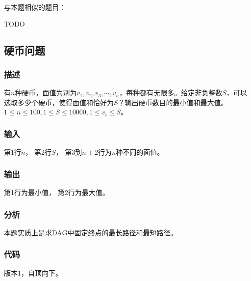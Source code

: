 与本题相似的题目：
\begindot
\item  TODO
\myenddot

\subsection{硬币问题}

\subsubsection{描述}
有$n$种硬币，面值为别为$v_1,v_2,v_3,\cdots, v_n$，每种都有无限多。给定非负整数$S$，可以
选取多少个硬币，使得面值和恰好为$S$？输出硬币数目的最小值和最大值。
$1 \leq n \leq 100, 1 \leq S \leq 10000, 1 \leq v_i \leq S$。

\subsubsection{输入}
第1行$n$，
第2行$S$，
第3到$n+2$行为$n$种不同的面值。

\subsubsection{输出}
第1行为最小值，
第2行为最大值。

\subsubsection{分析}
本题实质上是求DAG中固定终点的最长路径和最短路径。

\subsubsection{代码}
版本1，自顶向下。

